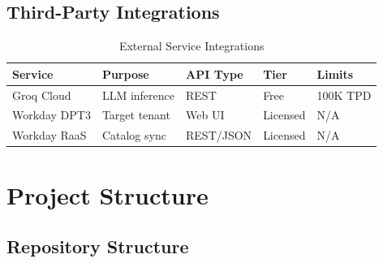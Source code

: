 \documentclass[12pt,a4paper]{article}
\begin{document}
\subsection{Third-Party Integrations}
\label{subsec:third-party}

\begin{table}[H]
\centering
\caption{External Service Integrations}
\label{tab:integrations}
\begin{tabularx}{\textwidth}{l X l l l}
\toprule
\textbf{Service} & \textbf{Purpose} & \textbf{API Type} & \textbf{Tier} & \textbf{Limits} \\
\midrule
Groq Cloud & LLM inference & REST & Free & 100K TPD \\
Workday DPT3 & Target tenant & Web UI & Licensed & N/A \\
Workday RaaS & Catalog sync & REST/JSON & Licensed & N/A \\
\bottomrule
\end{tabularx}
\end{table}

\section{Project Structure}
\label{sec:project-structure}

\subsection{Repository Structure}
\label{subsec:repo-structure}
\end{document}
